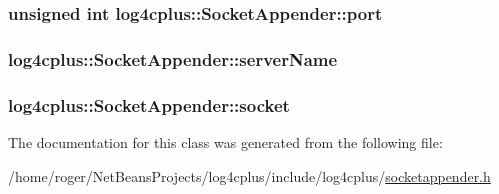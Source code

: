 \hypertarget{classlog4cplus_1_1SocketAppender_a26142f3cac36979c29f75f211e5a712b}{
\subsubsection[{port}]{\setlength{\rightskip}{0pt plus 5cm}unsigned int log4cplus\-::\-Socket\-Appender\-::port\hspace{0.3cm}{\ttfamily [protected]}}}\label{classlog4cplus_1_1SocketAppender_a26142f3cac36979c29f75f211e5a712b}
\hypertarget{classlog4cplus_1_1SocketAppender_a185846efa2514d35f6009091a047a57e}{
\subsubsection[{server\-Name}]{ log4cplus\-::\-Socket\-Appender\-::server\-Name\hspace{0.3cm}{\ttfamily [protected]}}}\label{classlog4cplus_1_1SocketAppender_a185846efa2514d35f6009091a047a57e}
\hypertarget{classlog4cplus_1_1SocketAppender_a50fc7d3acd06519f954c8803dcbd774a}{
\subsubsection[{socket}]{ log4cplus\-::\-Socket\-Appender\-::socket\hspace{0.3cm}{\ttfamily [protected]}}}\label{classlog4cplus_1_1SocketAppender_a50fc7d3acd06519f954c8803dcbd774a}


The documentation for this class was generated from the following file\-:\begin{DoxyCompactItemize}
\item 
/home/roger/\-Net\-Beans\-Projects/log4cplus/include/log4cplus/\hyperlink{socketappender_8h}{socketappender.\-h}\end{DoxyCompactItemize}
